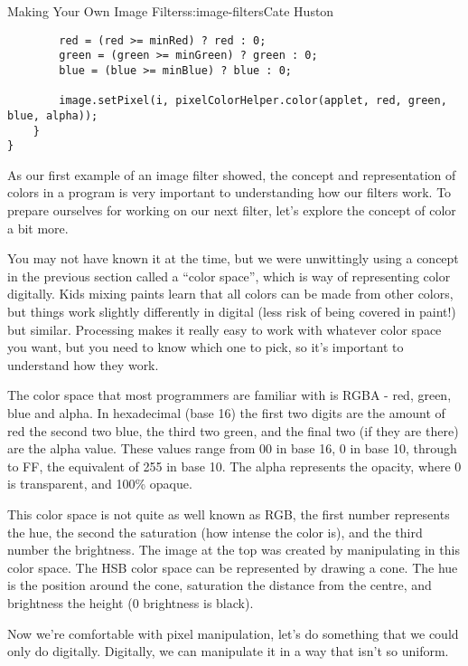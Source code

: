 \begin{aosachapter}{Making Your Own Image Filters}{s:image-filters}{Cate Huston}
\begin{verbatim}
        red = (red >= minRed) ? red : 0;
        green = (green >= minGreen) ? green : 0;
        blue = (blue >= minBlue) ? blue : 0;
        
        image.setPixel(i, pixelColorHelper.color(applet, red, green, blue, alpha));
    }
}
\end{verbatim}

\label{color}

As our first example of an image filter showed, the concept and
representation of colors in a program is very important to understanding
how our filters work. To prepare ourselves for working on our next
filter, let's explore the concept of color a bit more.

You may not have known it at the time, but we were unwittingly using a
concept in the previous section called a ``color space'', which is way
of representing color digitally. Kids mixing paints learn that all
colors can be made from other colors, but things work slightly
differently in digital (less risk of being covered in paint!) but
similar. Processing makes it really easy to work with whatever color
space you want, but you need to know which one to pick, so it's
important to understand how they work.

\label{rgb-colors}

The color space that most programmers are familiar with is RGBA - red,
green, blue and alpha. In hexadecimal (base 16) the first two digits are
the amount of red the second two blue, the third two green, and the
final two (if they are there) are the alpha value. These values range
from 00 in base 16, 0 in base 10, through to FF, the equivalent of 255
in base 10. The alpha represents the opacity, where 0 is transparent,
and 100\% opaque.

\label{hsb-or-hsv-colors}

This color space is not quite as well known as RGB, the first number
represents the hue, the second the saturation (how intense the color
is), and the third number the brightness. The image at the top was
created by manipulating in this color space. The HSB color space can be
represented by drawing a cone. The hue is the position around the cone,
saturation the distance from the centre, and brightness the height (0
brightness is black).

\label{extracting-the-dominant-hue-from-an-image}

Now we're comfortable with pixel manipulation, let's do something that
we could only do digitally. Digitally, we can manipulate it in a way
that isn't so uniform.


\end{aosachapter}
